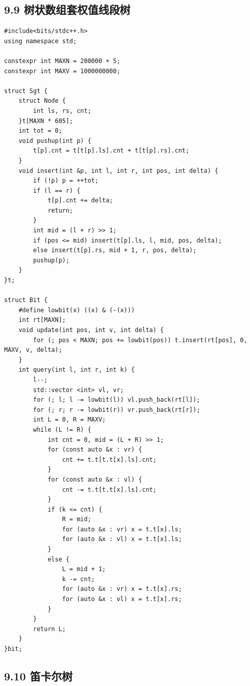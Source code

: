 \documentclass[UTF8,a4paper,11pt]{ctexart}
\begin{document}
\subsection*{9.9 树状数组套权值线段树}

\begin{Verbatim}[fontsize=\small,frame=single,breaklines=true,breakanywhere=true]
#include<bits/stdc++.h>
using namespace std;

constexpr int MAXN = 200000 + 5;
constexpr int MAXV = 1000000000;

struct Sgt {
    struct Node {
        int ls, rs, cnt;
    }t[MAXN * 605];
    int tot = 0;
    void pushup(int p) {
        t[p].cnt = t[t[p].ls].cnt + t[t[p].rs].cnt;
    }
    void insert(int &p, int l, int r, int pos, int delta) {
        if (!p) p = ++tot;
        if (l == r) {
            t[p].cnt += delta;
            return;
        }
        int mid = (l + r) >> 1;
        if (pos <= mid) insert(t[p].ls, l, mid, pos, delta);
        else insert(t[p].rs, mid + 1, r, pos, delta);
        pushup(p);
    }
}t;

struct Bit {
    #define lowbit(x) ((x) & (-(x)))
    int rt[MAXN];
    void update(int pos, int v, int delta) {
        for (; pos < MAXN; pos += lowbit(pos)) t.insert(rt[pos], 0, MAXV, v, delta);
    }
    int query(int l, int r, int k) {
        l--;
        std::vector <int> vl, vr;
        for (; l; l -= lowbit(l)) vl.push_back(rt[l]);
        for (; r; r -= lowbit(r)) vr.push_back(rt[r]);
        int L = 0, R = MAXV;
        while (L != R) {
            int cnt = 0, mid = (L + R) >> 1;
            for (const auto &x : vr) {
                cnt += t.t[t.t[x].ls].cnt;
            }
            for (const auto &x : vl) {
                cnt -= t.t[t.t[x].ls].cnt;
            }
            if (k <= cnt) {
                R = mid;
                for (auto &x : vr) x = t.t[x].ls;
                for (auto &x : vl) x = t.t[x].ls;
            }
            else {
                L = mid + 1;
                k -= cnt;
                for (auto &x : vr) x = t.t[x].rs;
                for (auto &x : vl) x = t.t[x].rs;
            }
        }
        return L;
    }
}bit;

\end{Verbatim}

\subsection*{9.10 笛卡尔树}
\end{document}
